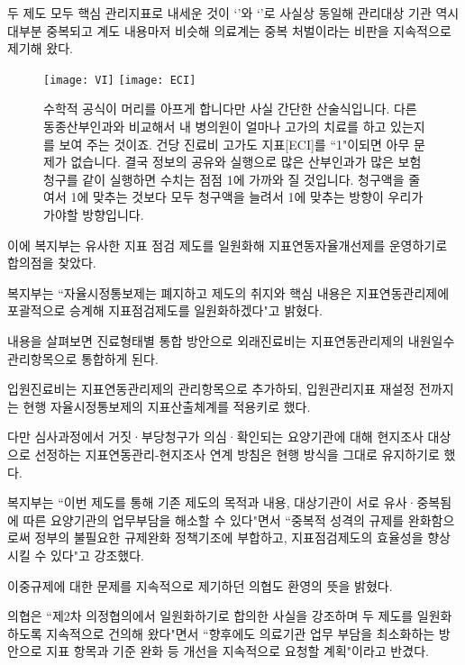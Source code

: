 두 제도 모두 핵심 관리지표로 내세운 것이 `'와 `'로 사실상 동일해 관리대상 기관 역시 대부분 중복되고 계도 내용마저 비슷해 의료계는 중복 처벌이라는 비판을 지속적으로 제기해 왔다.
\begin{figure}
\texttt{[image: VI]}
\texttt{[image: ECI]}
\caption{수학적 공식이 머리를 아프게 합니다만 사실 간단한 산술식입니다.
다른 동종산부인과와 비교해서 내 병의원이 얼마나 고가의 치료를 하고 있는지를 보여 주는 것이죠.
건당 진료비 고가도 지표[ECI]를 ``1"이되면 아무 문제가 없습니다.
결국 정보의 공유와 실행으로 많은 산부인과가 많은 보험청구를 같이 실행하면 수치는 점점 1에 가까와 질 것입니다.
청구액을 줄여서 1에 맞추는 것보다 모두 청구액을 늘려서 1에 맞추는 방향이 우리가 가야할 방향입니다.
 }
\end{figure}

이에 복지부는 유사한 지표 점검 제도를 일원화해 지표연동자율개선제를 운영하기로 합의점을 찾았다.

복지부는 ``자율시정통보제는 폐지하고 제도의 취지와 핵심 내용은 지표연동관리제에 포괄적으로 승계해 지표점검제도를 일원화하겠다"고 밝혔다.

내용을 살펴보면 진료형태별 통합 방안으로 외래진료비는 지표연동관리제의 내원일수 관리항목으로 통합하게 된다.

입원진료비는 지표연동관리제의 관리항목으로 추가하되, 입원관리지표 재설정 전까지는 현행 자율시정통보제의 지표산출체계를 적용키로 했다.

다만 심사과정에서 거짓·부당청구가 의심·확인되는 요양기관에 대해 현지조사 대상으로 선정하는 지표연동관리-현지조사 연계 방침은 현행 방식을 그대로 유지하기로 했다.

복지부는 ``이번 제도를 통해 기존 제도의 목적과 내용, 대상기관이 서로 유사·중복됨에 따른 요양기관의 업무부담을 해소할 수 있다"면서 ``중복적 성격의 규제를 완화함으로써 정부의 불필요한 규제완화 정책기조에 부합하고, 지표점검제도의 효율성을 향상시킬 수 있다"고 강조했다.

이중규제에 대한 문제를 지속적으로 제기하던 의협도 환영의 뜻을 밝혔다.

의협은 ``제2차 의정협의에서 일원화하기로 합의한 사실을 강조하며 두 제도를 일원화하도록 지속적으로 건의해 왔다"면서 ``향후에도 의료기관 업무 부담을 최소화하는 방안으로 지표 항목과 기준 완화 등 개선을 지속적으로 요청할 계획"이라고 반겼다.

